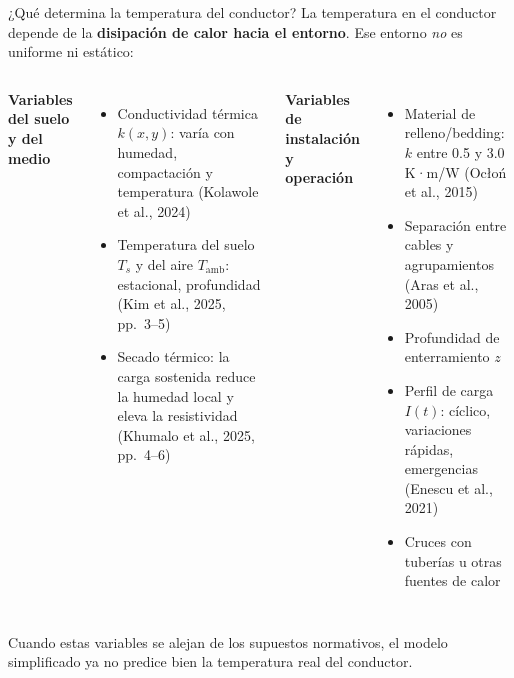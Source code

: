 \documentclass[aspectratio=169]{beamer}
\newcommand{\refcite}[1]{{\footnotesize\color{gray!70!black} #1}}
\begin{document}
\begin{frame}{¿Qué determina la temperatura del conductor?}
\justifying\small
La temperatura en el conductor depende de la \textbf{disipación de calor hacia
el entorno}. Ese entorno \emph{no} es uniforme ni estático:

\vspace{0.2em}
\begin{columns}[T]
\textbf{\small Variables del suelo y del medio}
\begin{itemize}[leftmargin=*]\scriptsize
    \item Conductividad térmica $k(x,y)$: varía con humedad,
          compactación y temperatura \refcite{(Kolawole et al., 2024)}
    \item Temperatura del suelo $T_s$ y del aire $T_\text{amb}$:
          estacional, profundidad \refcite{(Kim et al., 2025, pp.~3--5)}
    \item Secado térmico: la carga sostenida reduce la humedad local y
          eleva la resistividad
          \refcite{(Khumalo et al., 2025, pp.~4--6)}
\end{itemize}
\textbf{\small Variables de instalación y operación}
\begin{itemize}[leftmargin=*]\scriptsize
    \item Material de relleno/bedding: $k$ entre 0.5 y 3.0 K·m/W
          \refcite{(Ocłoń et al., 2015)}
    \item Separación entre cables y agrupamientos
          \refcite{(Aras et al., 2005)}
    \item Profundidad de enterramiento $z$
    \item Perfil de carga $I(t)$: cíclico, variaciones rápidas, emergencias
          \refcite{(Enescu et al., 2021)}
    \item Cruces con tuberías u otras fuentes de calor
\end{itemize}
\end{columns}

\vspace{0.2em}
\begin{exampleblock}{}
\centering\small
Cuando estas variables se alejan de los supuestos normativos,
el modelo simplificado ya no predice bien la temperatura real del conductor.
\end{exampleblock}
\end{frame}

\end{document}
